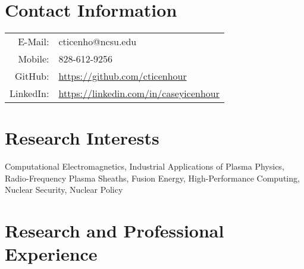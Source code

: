 \documentclass{article}
\title{\vspace{-2.5em}{\huge \textbf{Casey Icenhour}}\vspace{-3em}}
\date{} %
\begin{document}
\maketitle

\section*{Contact Information}

\begin{tabularx}{\textwidth}{r l}
	\hspace{3em} E-Mail:  & \hspace{2em} cticenho@ncsu.edu \\
	\hspace{3em} Mobile: & \hspace{2em} 828-612-9256 \\
	\hspace{3em} GitHub: & \hspace{2em} \url{https://github.com/cticenhour} \\
	\hspace{3em} LinkedIn: & \hspace{2em} \url{https://linkedin.com/in/caseyicenhour}
\end{tabularx}

\section*{Research Interests}

\hspace{0.07\textwidth} \begin{minipage}[t][2em][s]{0.92\textwidth}
	Computational Electromagnetics, Industrial Applications of Plasma Physics, Radio-Frequency Plasma Sheaths, Fusion Energy, High-Performance Computing, Nuclear Security, Nuclear Policy
\end{minipage}

\section*{Research and Professional Experience}
\end{document}
